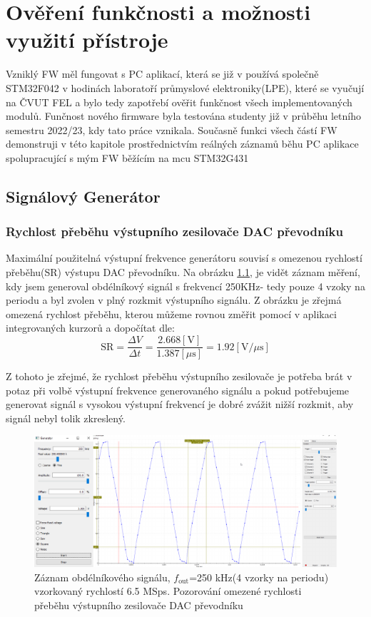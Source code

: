\chapter{Ověření funkčnosti a možnosti využití přístroje}
Vzniklý FW měl fungovat s PC aplikací, která se již v používá společně STM32F042 v hodinách laboratoří průmyslové elektroniky(LPE), které se vyučují na ČVUT FEL a bylo tedy zapotřebí ověřit funkčnost všech implementovaných modulů. Funčnost nového firmware byla testována studenty již v průběhu letního semestru 2022/23, kdy tato práce vznikala. Současně funkci všech částí FW demonstruji v této kapitole prostřednictvím reálných záznamů běhu PC aplikace spolupracující s mým FW běžícím na mcu STM32G431
\section{Signálový Generátor}
\subsection{Rychlost přeběhu výstupního zesilovače DAC převodníku}
Maximální použitelná výstupní frekvence generátoru souvisí s omezenou rychlostí přeběhu(SR) výstupu DAC převodníku. Na obrázku \ref{fig:Obdelnik250kReal}, je vidět záznam měření, kdy jsem generoval obdélníkový signál s frekvencí 250KHz- tedy pouze 4 vzoky na periodu a byl zvolen v plný rozkmit výstupního signálu. Z obrázku je zřejmá omezená rychlost přeběhu, kterou můžeme rovnou změřit pomocí v aplikaci integrovaných kurzorů a dopočítat dle:
\begin{equation}
	\text{SR}=\frac{\Delta V}{\Delta t}=\frac{2.668 [\text{V}]}{1.387 [\mu\text{s}]}=1.92 [\text{V/}\mu\text{s}]
\end{equation}

Z tohoto je zřejmé, že rychlost přeběhu výstupního zesilovače je potřeba brát v potaz při volbě výstupní frekvence generovaného signálu a pokud potřebujeme generovat signál s vysokou výstupní frekvencí je dobré zvážit nižší rozkmit, aby signál nebyl tolik zkreslený.

\begin{figure}[H]
	\centering
	\includegraphics[width=0.9\linewidth]{Figs/Screenshots/RychlostPrebehuReal.pdf}
	\caption{Záznam obdélníkového signálu, $f_{\text{out}}$=250 kHz(4 vzorky na periodu) vzorkovaný rychlostí 6.5 MSps. Pozorování omezené rychlosti přeběhu výstupního zesilovače DAC převodníku}
	\label{fig:Obdelnik250kReal}
\end{figure}
